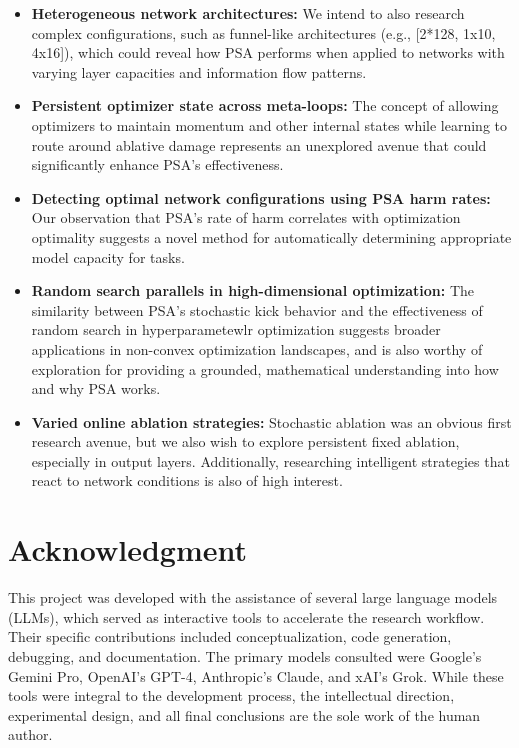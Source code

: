 \documentclass[conference]{IEEEtran}
\begin{document}
\begin{itemize}
\item \textbf{Heterogeneous network architectures:} We intend to also research complex configurations, such as funnel-like architectures (e.g., [2*128, 1x10, 4x16]), which could reveal how PSA performs when applied to networks with varying layer capacities and information flow patterns.

\item \textbf{Persistent optimizer state across meta-loops:} The concept of allowing optimizers to maintain momentum and other internal states while learning to route around ablative damage represents an unexplored avenue that could significantly enhance PSA's effectiveness.

\item \textbf{Detecting optimal network configurations using PSA harm rates:} Our observation that PSA's rate of harm correlates with optimization optimality suggests a novel method for automatically determining appropriate model capacity for tasks.

\item \textbf{Random search parallels in high-dimensional optimization:} The similarity between PSA's stochastic kick behavior and the effectiveness of random search in hyperparametewlr optimization suggests broader applications in non-convex optimization landscapes, and is also worthy of exploration for providing a grounded, mathematical understanding into how and why PSA works.

\item \textbf{Varied online ablation strategies:} Stochastic ablation was an obvious first research avenue, but we also wish to explore persistent fixed ablation, especially in output layers. Additionally, researching intelligent strategies that react to network conditions is also of high interest.

\end{itemize}

\section*{Acknowledgment}
This project was developed with the assistance of several large language models (LLMs), which served as interactive tools to accelerate the research workflow. Their specific contributions included conceptualization, code generation, debugging, and documentation. The primary models consulted were Google's Gemini Pro, OpenAI's GPT-4, Anthropic's Claude, and xAI's Grok. While these tools were integral to the development process, the intellectual direction, experimental design, and all final conclusions are the sole work of the human author.
\end{document}

